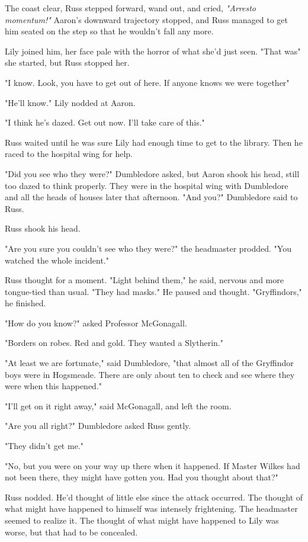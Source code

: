 The coast clear, Russ stepped forward, wand out, and cried, \emph{"Arresto momentum!"} Aaron's downward trajectory stopped, and Russ managed to get him seated on the step so that he wouldn't fall any more.

Lily joined him, her face pale with the horror of what she'd just seen. "That was{\el}" she started, but Russ stopped her.

"I know. Look, you have to get{\el} out of here. If anyone knows we were{\el} together{\el}"

"He'll know." Lily nodded at Aaron.

"I think he's{\el} dazed. Get out now. I'll take{\el} care of this."

Russ waited until he was sure Lily had enough time to get to the library. Then he raced to the hospital wing for help.

"Did you see who they were?" Dumbledore asked, but Aaron shook his head, still too dazed to think properly. They were in the hospital wing with Dumbledore and all the heads of houses later that afternoon. "And you?" Dumbledore said to Russ.

Russ shook his head.

"Are you sure you couldn't see who they were?" the headmaster prodded. "You watched the whole incident."

Russ thought for a moment. "Light{\el} behind them," he said, nervous and more tongue-tied than usual. "They{\el} had{\el} masks." He paused and thought. "Gryffindors," he finished.

"How do you know?" asked Professor McGonagall.

"Borders on{\el} robes. Red and{\el} gold. They wanted a{\el} Slytherin."

"At least we are fortunate," said Dumbledore, "that almost all of the Gryffindor boys were in Hogsmeade. There are only about ten to check and see where they were when this happened."

"I'll get on it right away," said McGonagall, and left the room.

"Are you all right?" Dumbledore asked Russ gently.

"They{\el} didn't get{\el} me."

"No, but you were on your way up there when it happened. If Master Wilkes had not been there, they might have gotten you. Had you thought about that?"

Russ nodded. He'd thought of little else since the attack occurred. The thought of what might have happened to himself was intensely frightening. The headmaster seemed to realize it. The thought of what might have happened to Lily was worse, but that had to be concealed.

